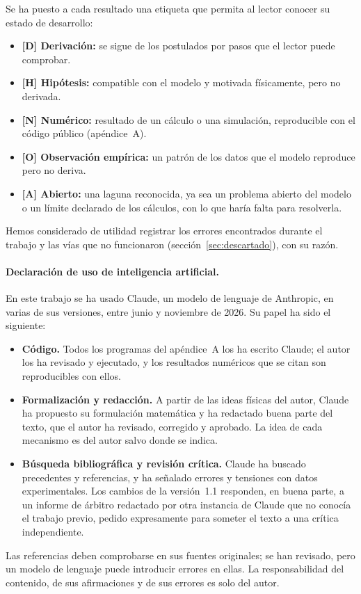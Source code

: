 \documentclass[11pt,a4paper]{article}
\newcommand{\st}[1]{\textup{[#1]}}
\newcommand{\apartado}[1]{\paragraph{#1}}
\begin{document}
Se ha puesto a cada resultado una etiqueta que permita al lector conocer su estado de desarrollo:

\begin{itemize}[leftmargin=*]
\item \textbf{\st{D} Derivación:} se sigue de los postulados por pasos que el lector puede comprobar.
\item \textbf{\st{H} Hipótesis:} compatible con el modelo y motivada físicamente, pero no derivada.
\item \textbf{\st{N} Numérico:} resultado de un cálculo o una simulación, reproducible con el código público (apéndice~A).
\item \textbf{\st{O} Observación empírica:} un patrón de los datos que el modelo reproduce pero no deriva.
\item \textbf{\st{A} Abierto:} una laguna reconocida, ya sea un problema abierto del modelo o un límite declarado de los cálculos, con lo que haría falta para resolverla.
\end{itemize}

Hemos considerado de utilidad registrar los errores encontrados durante el trabajo y las vías que no funcionaron (sección~\ref{sec:descartado}), con su razón.

\apartado{Declaración de uso de inteligencia artificial.} En este trabajo se ha usado Claude, un modelo de lenguaje de Anthropic, en varias de sus versiones, entre junio y noviembre de 2026. Su papel ha sido el siguiente:
\begin{itemize}[leftmargin=*]
\item \textbf{Código.} Todos los programas del apéndice~A los ha escrito Claude; el autor los ha revisado y ejecutado, y los resultados numéricos que se citan son reproducibles con ellos.
\item \textbf{Formalización y redacción.} A partir de las ideas físicas del autor, Claude ha propuesto su formulación matemática y ha redactado buena parte del texto, que el autor ha revisado, corregido y aprobado. La idea de cada mecanismo es del autor salvo donde se indica.
\item \textbf{Búsqueda bibliográfica y revisión crítica.} Claude ha buscado precedentes y referencias, y ha señalado errores y tensiones con datos experimentales. Los cambios de la versión~1.1 responden, en buena parte, a un informe de árbitro redactado por otra instancia de Claude que no conocía el trabajo previo, pedido expresamente para someter el texto a una crítica independiente.
\end{itemize}
Las referencias deben comprobarse en sus fuentes originales; se han revisado, pero un modelo de lenguaje puede introducir errores en ellas. La responsabilidad del contenido, de sus afirmaciones y de sus errores es solo del autor.
\end{document}

